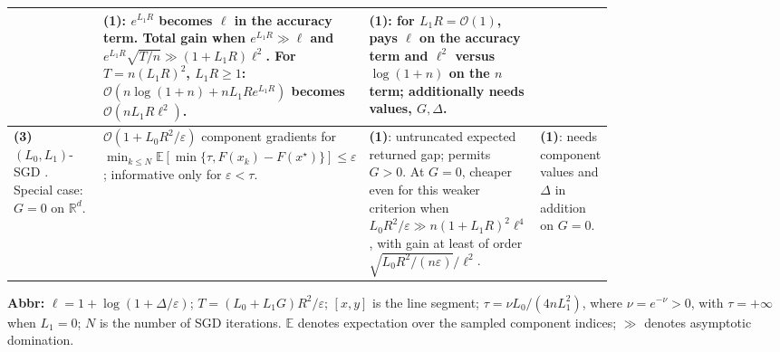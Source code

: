\begin{table}[tp]
\begin{threeparttable}
\begin{tabularx}{\linewidth}{@{}>{\raggedright\arraybackslash}p{0.20\linewidth}>{\raggedright\arraybackslash}p{0.32\linewidth}>{\raggedright\arraybackslash}p{0.25\linewidth}>{\raggedright\arraybackslash}X@{}}
& \textbf{(1)}: $e^{L_1R}$ becomes $\ell$ in the accuracy term. Total gain when $e^{L_1R}\gg\ell$ and $e^{L_1R}\sqrt{T/n}\gg(1+L_1R)\ell^2$.
For $T=n(L_1R)^2$, $L_1R\ge1$: $\mathcal{O}(n\log(1+n)+nL_1R e^{L_1R})$ becomes $\mathcal{O}(nL_1R\ell^2)$.
& \textbf{(1)}: for $L_1R=\mathcal{O}(1)$, pays $\ell$ on the accuracy term and $\ell^2$ versus $\log(1+n)$ on the $n$ term; additionally needs values, $G,\Delta$. \\
\midrule
\textbf{(3)} $(L_0,L_1)$-SGD \citep[Thm.~7.2]{gsfsGorbunov2024v2}. Special case: $G=0$ on $\mathbb{R}^d$.
& $\mathcal{O}(1+L_0R^2/\varepsilon)$ component gradients for $\min_{k\le N}\mathbb{E}[\min\{\tau,F(x_k)-F(x^\star)\}]\le\varepsilon$; informative only for $\varepsilon<\tau$.
& \textbf{(1)}: untruncated expected returned gap; permits $G>0$. At $G=0$, cheaper even for this weaker criterion when $L_0R^2/\varepsilon\gg n(1+L_1R)^2\ell^4$, with gain at least of order $\sqrt{L_0R^2/(n\varepsilon)}/\ell^2$.
& \textbf{(1)}: needs component values and $\Delta$ in addition on $G=0$. \\
\bottomrule
\end{tabularx}
\begin{tablenotes}[flushleft]\footnotesize
\item[] \textbf{Abbr:} $\ell=1+\log(1+\Delta/\varepsilon)$; $T=(L_0+L_1G)R^2/\varepsilon$; $[x,y]$ is the line segment; $\tau=\nu L_0/(4nL_1^2)$, where $\nu=e^{-\nu}>0$, with $\tau=+\infty$ when $L_1=0$; $N$ is the number of SGD iterations. $\mathbb{E}$ denotes expectation over the sampled component indices; $\gg$ denotes asymptotic domination.
\end{tablenotes}
\end{threeparttable}
\end{table}
